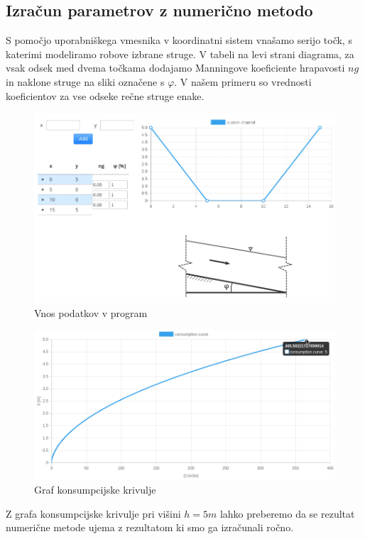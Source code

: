 \subsection{Izračun parametrov z numerično metodo}

S pomočjo uporabniškega vmesnika v koordinatni sistem vnašamo serijo točk, s katerimi modeliramo robove izbrane struge. V tabeli na levi strani diagrama, za vsak odsek med dvema točkama dodajamo Manningove koeficiente hrapavosti $ng$ in naklone struge na sliki označene s $\varphi$. V našem primeru so vrednosti koeficientov za vse odseke rečne struge enake.

\begin{figure}[ht!]
	\begin{centering}
		\includegraphics[width=\textwidth]{slike/izracuni/modeliranjeStruge.png}		
		\caption{Vnos podatkov v program}\label{fig:modeliranjeStruge}
	\end{centering}
\end{figure}

\begin{figure}[H]
	\begin{centering}
		\includegraphics[width=\textwidth]{slike/izracuni/consumptionCurve.png}		
		\caption{Graf konsumpcijske krivulje}\label{fig:custom_konsumpcijskaKrivulja}
	\end{centering}
\end{figure}


Z grafa konsumpcijske krivulje pri višini $h = 5m$ lahko preberemo da se rezultat numerične metode ujema z rezultatom ki smo ga izračunali ročno.

